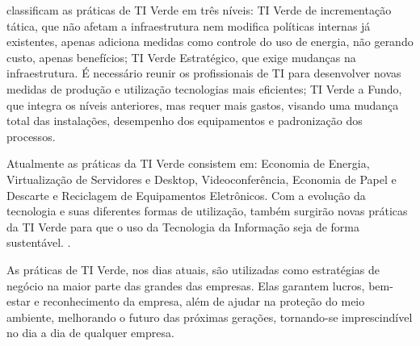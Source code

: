  classificam as práticas de TI Verde em três níveis: TI Verde de incrementação tática, que não afetam a infraestrutura nem modifica políticas internas já existentes, apenas adiciona medidas como controle do uso de energia, não gerando custo, apenas benefícios; TI Verde Estratégico, que exige mudanças na infraestrutura. É necessário reunir os profissionais de TI para desenvolver novas medidas de produção e utilização tecnologias mais eficientes; TI Verde a Fundo, que integra os níveis anteriores, mas requer mais gastos, visando uma mudança total das instalações, desempenho dos equipamentos e padronização dos processos.

\begin{citacao}
Atualmente as práticas da TI Verde consistem em: Economia de Energia, Virtualização de Servidores e Desktop, Videoconferência, Economia de Papel e Descarte e Reciclagem de Equipamentos Eletrônicos. Com a evolução da tecnologia e suas diferentes formas de utilização, também surgirão novas práticas da TI Verde para que o uso da Tecnologia da Informação seja de forma sustentável. \cite[p. 8]{pinto2011estudo}.
\end{citacao} 

As práticas de TI Verde, nos dias atuais, são utilizadas como estratégias de negócio na maior parte das grandes das empresas. Elas garantem lucros, bem-estar e reconhecimento da empresa, além de ajudar na proteção do meio ambiente, melhorando o futuro das próximas gerações, tornando-se imprescindível no dia a dia de qualquer empresa.